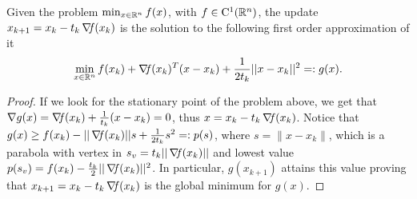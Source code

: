 \documentclass[10pt,a4paper]{article}
\begin{document}
\begin{lemma}\label{lemma:mirror_descent}
	Given the problem $\min_{x\in\mathbb{R}^n} f(x)$, with $f\in \mathord{\mathrm{C^1}}(\mathbb{R}^n)$, the update $x_{k+1} = x_k - t_k \operatorname*{\mathit{\nabla \!f}}(x_k)$ is the solution to the following first order approximation of it
	\begin{equation}\label{eq:mirror_descent}
		\min_{x\in \mathbb{R}^n} f(x_k) + \operatorname*{\mathit{\nabla \!f}}(x_k)^T(x-x_k) + \frac{1}{2t_k} ||x-x_k||^2 =:g(x).
	\end{equation}
\end{lemma}
\begin{proof}
	If we look for the stationary point of the problem above, we get that $\nabla g(x) = \operatorname*{\mathit{\nabla \!f}}(x_k) + \frac{1}{t_k}(x-x_k)=0$, thus $x = x_k - t_k \operatorname*{\mathit{\nabla \!f}}(x_k)$. Notice that $g(x)\geq  f(x_k) - ||\operatorname*{\mathit{\nabla \!f}}(x_k)|| s + \frac{1}{2t_k} s^2=:p(s)$, where $s=\|x-x_k\|$, which is a parabola with vertex in $s_v=t_k||\operatorname*{\mathit{\nabla \!f}}(x_k)||$ and lowest value $p(s_v) = f(x_k) -\frac{t_k}{2} ||\operatorname*{\mathit{\nabla \!f}}(x_k)||^2$. In particular, $g(x_{k+1})$ attains this value proving that $x_{k+1}= x_k - t_k \operatorname*{\mathit{\nabla \!f}}(x_k)$ is the global minimum for $g(x)$.
\end{proof}
\end{document}
